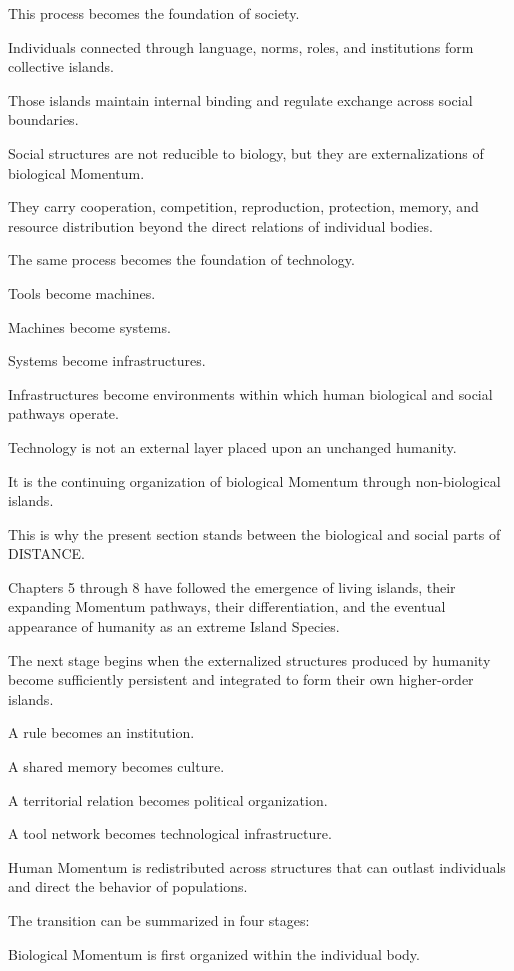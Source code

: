 This process becomes the foundation of society.

Individuals connected through language, norms, roles, and institutions form collective islands.

Those islands maintain internal binding and regulate exchange across social boundaries.

Social structures are not reducible to biology, but they are externalizations of biological Momentum.

They carry cooperation, competition, reproduction, protection, memory, and resource distribution beyond the direct relations of individual bodies.

The same process becomes the foundation of technology.

Tools become machines.

Machines become systems.

Systems become infrastructures.

Infrastructures become environments within which human biological and social pathways operate.

Technology is not an external layer placed upon an unchanged humanity.

It is the continuing organization of biological Momentum through non-biological islands.

This is why the present section stands between the biological and social parts of DISTANCE.

Chapters 5 through 8 have followed the emergence of living islands, their expanding Momentum pathways, their differentiation, and the eventual appearance of humanity as an extreme Island Species.

The next stage begins when the externalized structures produced by humanity become sufficiently persistent and integrated to form their own higher-order islands.

A rule becomes an institution.

A shared memory becomes culture.

A territorial relation becomes political organization.

A tool network becomes technological infrastructure.

Human Momentum is redistributed across structures that can outlast individuals and direct the behavior of populations.

The transition can be summarized in four stages:

Biological Momentum is first organized within the individual body.

